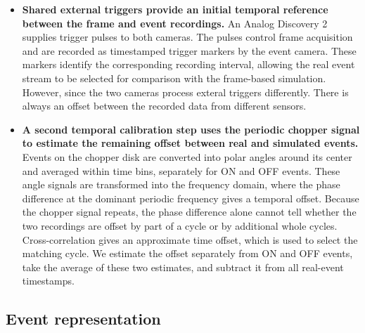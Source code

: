 \begin{itemize}
  \item \textbf{Shared external triggers provide an initial temporal reference between the frame and event recordings.} An Analog Discovery 2 supplies trigger pulses to both cameras. The pulses control frame acquisition and are recorded as timestamped trigger markers by the event camera. These markers identify the corresponding recording interval, allowing the real event stream to be selected for comparison with the frame-based simulation. However, since the two cameras process exteral triggers differently. There is always an offset between the recorded data from different sensors.
  
  \item \textbf{A second temporal calibration step uses the periodic chopper signal to estimate the remaining offset between real and simulated events.} Events on the chopper disk are converted into polar angles around its center and averaged within time bins, separately for ON and OFF events. These angle signals are transformed into the frequency domain, where the phase difference at the dominant periodic frequency gives a temporal offset. Because the chopper signal repeats, the phase difference alone cannot tell whether the two recordings are offset by part of a cycle or by additional whole cycles. Cross-correlation gives an approximate time offset, which is used to select the matching cycle. We estimate the offset separately from ON and OFF events, take the average of these two estimates, and subtract it from all real-event timestamps.
  
\end{itemize}

\subsection{Event representation}

